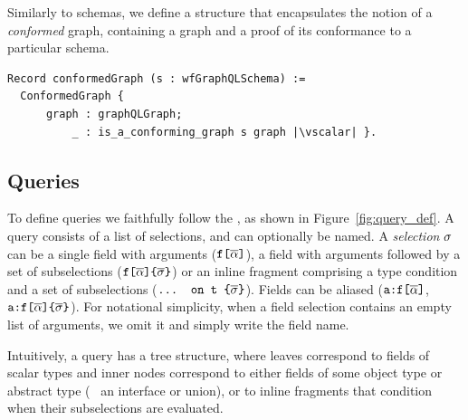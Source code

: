 Similarly to \gql schemas, we define a structure that encapsulates the notion of a \textit{conformed} graph, containing a graph and a proof of its conformance to a particular schema.
\begin{verbatim}
Record conformedGraph (s : wfGraphQLSchema) :=
  ConformedGraph { 
      graph : graphQLGraph;
          _ : is_a_conforming_graph s graph |\vscalar| }.
\end{verbatim}




\subsection{Queries}\label{subsec:query}



To define queries we faithfully follow the \spec, as shown in
Figure~\ref{fig:query_def}. A query consists of a list of selections, and can optionally be named.
A \emph{selection} $\sigma$ 
can be a single field with arguments ($\texttt{f[}\overline{\alpha}\texttt{]}$), a field
with arguments followed by a set of subselections
($\texttt{f[}\overline{\alpha}\texttt{]} \texttt{\{} \overline{\sigma} \texttt{\}}$) or an inline fragment
comprising a type condition and a set of subselections
($\texttt{... on t \{}\overline{\sigma}\texttt{\}}$). Fields can be aliased ($\texttt{a:}\texttt{f[}\overline{\alpha}\texttt{]}$, $\texttt{a:}\texttt{f[}\overline{\alpha}\texttt{]} \texttt{\{} \overline{\sigma} \texttt{\}}$). 
For notational simplicity, when a field selection contains an empty list
of arguments, we omit it and simply write the field name.






Intuitively, a query has a tree structure, where leaves correspond to
fields of scalar types and inner nodes correspond to either fields of
some object type or abstract type (\ie~ an interface or union),
or to inline fragments that condition when their subselections are evaluated. 

